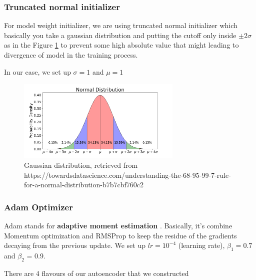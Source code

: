 \subsubsection*{Truncated normal initializer}
For model weight initializer, we are using truncated normal initializer which basically you take a gaussian distribution and putting the cutoff only inside $\pm2\sigma$ as in the Figure \ref{fig:normal_dist} to prevent some high absolute value that might leading to divergence of model in the training process.

In our case, we set up $\sigma=1$ and $\mu=1$ 
\begin{figure}[h!]
    \centering
    \includegraphics[width=0.7\textwidth]{images/normal_dist.png}
    \caption{Gaussian distribution, retrieved from https://towardsdatascience.com/understanding-the-68-95-99-7-rule-for-a-normal-distribution-b7b7cbf760c2}
    \label{fig:normal_dist}
\end{figure}

\subsubsection*{Adam Optimizer}
Adam stands for \textbf{adaptive moment estimation} \cite{adam}. Basically, it's combine Momentum optimization and RMSProp to keep the residue of the gradients decaying from the previous update.
We set up $lr = 10^{-4}$ (learning rate), $\beta_1 = 0.7$ and $\beta_2$ = 0.9.
\vspace{0.4in}
\par There are 4 flavours of our autoencoder that we constructed

